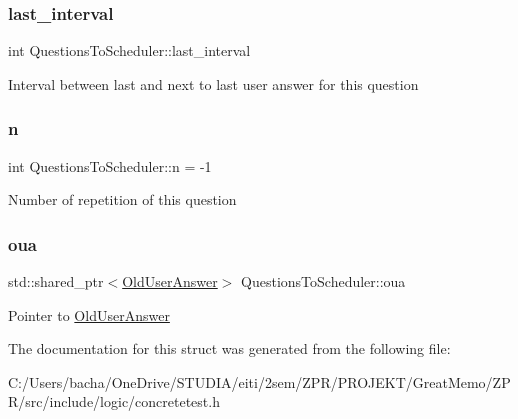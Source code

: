 \subsubsection{\texorpdfstring{last\+\_\+interval}{last\_interval}}
{\footnotesize\ttfamily int Questions\+To\+Scheduler\+::last\+\_\+interval}

Interval between last and next to last user answer for this question \mbox{\label{struct_questions_to_scheduler_a113956e9ee3927ec46b7680bf796a1bc}} 
\subsubsection{\texorpdfstring{n}{n}}
{\footnotesize\ttfamily int Questions\+To\+Scheduler\+::n = -\/1}

Number of repetition of this question \mbox{\label{struct_questions_to_scheduler_ae48fc05cb9de46b9db8b9868855d386d}} 
\subsubsection{\texorpdfstring{oua}{oua}}
{\footnotesize\ttfamily std\+::shared\+\_\+ptr$<$\hyperlink{class_old_user_answer}{Old\+User\+Answer}$>$ Questions\+To\+Scheduler\+::oua}

Pointer to \hyperlink{class_old_user_answer}{Old\+User\+Answer} 

The documentation for this struct was generated from the following file\+:\begin{DoxyCompactItemize}
\item 
C\+:/\+Users/bacha/\+One\+Drive/\+S\+T\+U\+D\+I\+A/eiti/2sem/\+Z\+P\+R/\+P\+R\+O\+J\+E\+K\+T/\+Great\+Memo/\+Z\+P\+R/src/include/logic/concretetest.\+h\end{DoxyCompactItemize}
